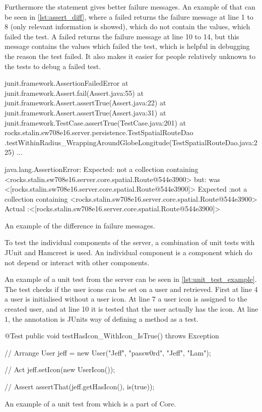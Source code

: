 Furthermore the  statement gives better failure messages\cite{hamcrest_vs_junit}.
An example of that can be seen in \cref{lst:assert_diff},
where a failed  returns the failure message at line 1 to 8 (only relevant information is showed),
which do not contain the values, which failed the test.
A failed  returns the failure message at line 10 to 14, 
but this message contains the values which failed the test,
which is helpful in debugging the reason the test failed.
It also makes it easier for people relatively unknown to the tests to debug a failed test.

\begin{listing}
    \begin{java2}
    junit.framework.AssertionFailedError
        at junit.framework.Assert.fail(Assert.java:55)
        at junit.framework.Assert.assertTrue(Assert.java:22)
        at junit.framework.Assert.assertTrue(Assert.java:31)
        at junit.framework.TestCase.assertTrue(TestCase.java:201)
        at rocks.stalin.sw708e16.server.persistence.TestSpatialRouteDao
            .testWithinRadius_WrappingAroundGlobeLongitude(TestSpatialRouteDao.java:225)
        ...

    java.lang.AssertionError: 
    Expected: not a collection containing <rocks.stalin.sw708e16.server.core.spatial.Route@544e3900>
    but: was <[rocks.stalin.sw708e16.server.core.spatial.Route@544e3900]>
    Expected :not a collection containing <rocks.stalin.sw708e16.server.core.spatial.Route@544e3900>
    Actual   :<[rocks.stalin.sw708e16.server.core.spatial.Route@544e3900]>
    \end{java2}
    \caption{An example of the difference in failure messages.}
    \label{lst:assert_diff}
\end{listing}

To test the individual components of the server, 
a combination of unit tests with JUnit and Hamcrest is used.
An individual component is a component which do not depend or interact with other components.

An example of a unit test from the server can be seen in \cref{lst:unit_test_example}.
The test checks if the user icons can be set on a user and retrieved.
First at line 4 a user is initialised without a user icon.
At line 7 a user icon is assigned to the created user,
and at line 10 it is tested that the user actually has the icon.
At line 1, the annotation  is JUnits way of defining a method as a test.

\begin{listing}
    \begin{java2}
        @Test
        public void testHasIcon_WithIcon_IsTrue() throws Exception {
            // Arrange
            User jeff = new User("Jeff", "passw0rd", "Jeff", "Lam");

            // Act
            jeff.setIcon(new UserIcon());

            // Assert
            assertThat(jeff.getHasIcon(), is(true));
        }
    \end{java2}
    \caption{An example of a unit test from  which is a part of Core.}
    \label{lst:unit_test_example}
\end{listing}

